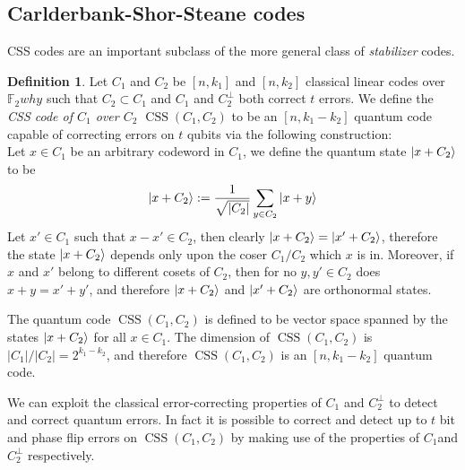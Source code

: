\documentclass[11pt,a4paper]{article}
\theoremstyle{definition}
\newtheorem{definition}{Definition}[section]
\theoremstyle{plain}
\theoremstyle{remark}
\begin{document}
\subsection{Carlderbank-Shor-Steane codes}
CSS codes are an important subclass of the more general class of \emph{stabilizer} codes. 
\begin{definition}
Let $C_1$ and $C_2$ be $[n, k_1]$ and $[n, k_2]$ classical linear codes over $\mathbb{F}_2why $ such that $C_2 \subset C_1$ and $C_1$ and $C_2^\perp$ both correct 
$t$ errors. We define the \emph{CSS code of $C_1$ over $C_2$ $\operatorname{CSS}(C_1, C_2)$} to be an $[n, k_1 - k_2]$ quantum code capable of correcting errors on $t$ qubits via the following construction: \\
Let $x \in C_1$ be an arbitrary codeword in $C_1$, we define the quantum state $\ket{x + C_2}$ to be 
$$\ket{x + C_2} := \frac{1}{\sqrt{|C_2|}} \sum_{y \in C_2} \ket{x + y}$$
Let $x' \in C_1$ such that $x - x' \in C_2$, then clearly $\ket{x + C_2} = \ket{x' + C_2}$, therefore the state $\ket{x + C_2}$ depends only upon the coser $C_1 / C_2$ which $x$ is in. 
Moreover, if $x$ and $x'$ belong to different cosets of $C_2$, then for no $y, y' \in C_2$ does $x + y = x' + y'$, and therefore $\ket{x + C_2}$ and $\ket{x' + C_2}$ are orthonormal states. 

The quantum code $\operatorname{CSS}(C_1, C_2)$ is defined to be vector space spanned by the states $\ket{x + C_2}$ for all $x \in C_1$. 
The dimension of $\operatorname{CSS}(C_1, C_2)$ is $|C_1|/|C_2| = 2^{k_1 - k_2}$, and therefore $\operatorname{CSS}(C_1, C_2)$ is an 
$[n, k_1 - k_2]$ quantum code.

We can exploit the classical error-correcting properties of $C_1$ and $C_2^\perp$ to detect and correct quantum errors. 
In fact it is possible to correct and detect up to $t$ bit and phase flip errors on $\operatorname{CSS}(C_1, C_2)$ by making use 
of the properties of $C_1 $and $C_2^\perp$ respectively. 
\end{definition}
\end{document}
